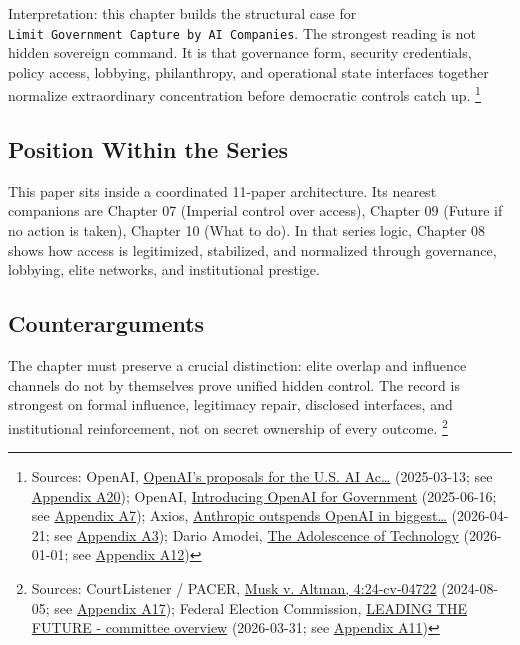 \documentclass[
  american,
  11pt,
  letterpaper,
]{article}
\begin{document}
Interpretation: this chapter builds the structural case for
\texttt{Limit\ Government\ Capture\ by\ AI\ Companies}. The strongest
reading is not hidden sovereign command. It is that governance form,
security credentials, policy access, lobbying, philanthropy, and
operational state interfaces together normalize extraordinary
concentration before democratic controls catch up. \footnote{Sources:
  OpenAI,
  \href{https://openai.com/global-affairs/openai-proposals-for-the-us-ai-action-plan/}{OpenAI's
  proposals for the U.S. AI Ac\ldots{}} (2025-03-13; see
  \hyperref[appendix-a20-openais-proposals-for-the-us-ai-action-plan]{Appendix
  A20}); OpenAI,
  \href{https://openai.com/global-affairs/introducing-openai-for-government/}{Introducing
  OpenAI for Government} (2025-06-16; see
  \hyperref[appendix-a7-introducing-openai-for-government]{Appendix
  A7}); Axios,
  \href{https://www.axios.com/2026/04/21/anthropic-outspends-openai-biggest-lobbying-quarter}{Anthropic
  outspends OpenAI in biggest\ldots{}} (2026-04-21; see
  \hyperref[appendix-a3-anthropic-outspends-openai-in-biggest-ever-lobbying-quarter]{Appendix
  A3}); Dario Amodei,
  \href{https://darioamodei.com/essay/the-adolescence-of-technology}{The
  Adolescence of Technology} (2026-01-01; see
  \hyperref[appendix-a12-the-adolescence-of-technology]{Appendix A12})}

\subsection{Position Within the
Series}\label{position-within-the-series}

This paper sits inside a coordinated 11-paper architecture. Its nearest
companions are Chapter 07 (Imperial control over access), Chapter 09
(Future if no action is taken), Chapter 10 (What to do). In that series
logic, Chapter 08 shows how access is legitimized, stabilized, and
normalized through governance, lobbying, elite networks, and
institutional prestige.

\subsection{Counterarguments}\label{counterarguments}

The chapter must preserve a crucial distinction: elite overlap and
influence channels do not by themselves prove unified hidden control.
The record is strongest on formal influence, legitimacy repair,
disclosed interfaces, and institutional reinforcement, not on secret
ownership of every outcome. \footnote{Sources: CourtListener / PACER,
  \href{https://www.courtlistener.com/docket/69013420/musk-v-altman/}{Musk
  v. Altman, 4:24-cv-04722} (2024-08-05; see
  \hyperref[appendix-a17-musk-v-altman-4-24-cv-04722]{Appendix A17});
  Federal Election Commission,
  \href{https://www.fec.gov/data/committee/C00916114/}{LEADING THE
  FUTURE - committee overview} (2026-03-31; see
  \hyperref[appendix-a11-leading-the-future-committee-overview]{Appendix
  A11})}
\end{document}
